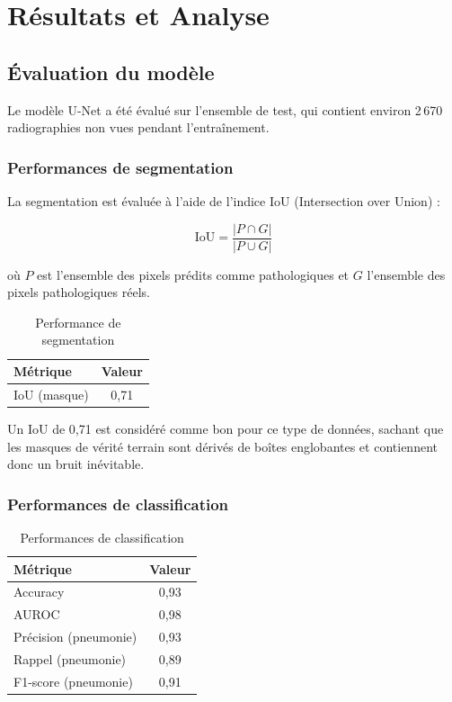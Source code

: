 \documentclass[12pt,a4paper,twoside]{report}
\begin{document}
\chapter{Résultats et Analyse}

\section{Évaluation du modèle}

Le modèle U-Net a été évalué sur l'ensemble de test, qui contient environ 2\,670 radiographies non vues pendant l'entraînement.

\subsection{Performances de segmentation}

La segmentation est évaluée à l'aide de l'indice IoU (Intersection over Union) :

\begin{equation}
\text{IoU} = \frac{|P \cap G|}{|P \cup G|}
\end{equation}

où $P$ est l'ensemble des pixels prédits comme pathologiques et $G$ l'ensemble des pixels pathologiques réels.

\begin{table}[H]
\centering
\begin{tabular}{lc}
\toprule
\textbf{Métrique} & \textbf{Valeur} \\
\midrule
IoU (masque) & 0,71 \\
\bottomrule
\end{tabular}
\caption{Performance de segmentation}
\end{table}

Un IoU de 0,71 est considéré comme bon pour ce type de données, sachant que les masques de vérité terrain sont dérivés de boîtes englobantes et contiennent donc un bruit inévitable.

\subsection{Performances de classification}

\begin{table}[H]
\centering
\begin{tabular}{lc}
\toprule
\textbf{Métrique} & \textbf{Valeur} \\
\midrule
Accuracy & 0,93 \\
AUROC & 0,98 \\
Précision (pneumonie) & 0,93 \\
Rappel (pneumonie) & 0,89 \\
F1-score (pneumonie) & 0,91 \\
\bottomrule
\end{tabular}
\caption{Performances de classification}
\end{table}
\end{document}

